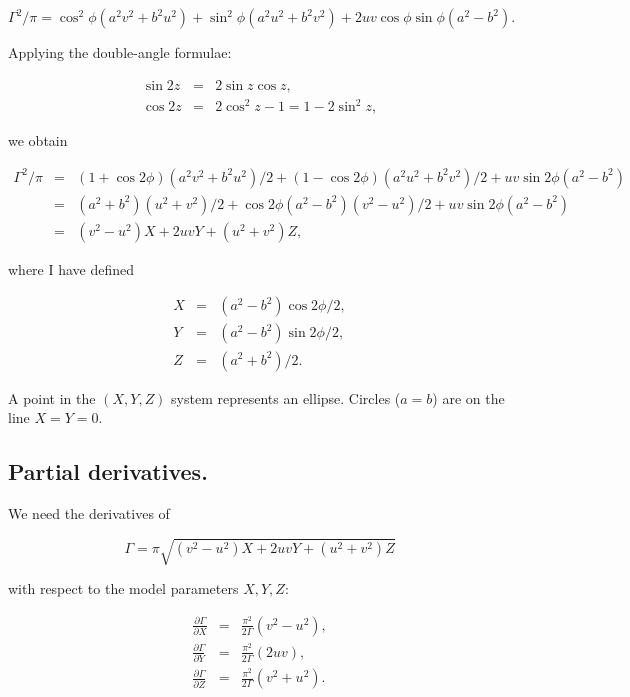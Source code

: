 \documentclass[11pt]{article}
\begin{document}
\begin{equation}
\Gamma^2/\pi = \cos^2\phi(a^2v^2 + b^2u^2) +
               \sin^2\phi(a^2u^2 + b^2v^2) + 2uv\cos\phi\sin\phi(a^2-b^2).
\end{equation}

Applying the double-angle formulae:

\begin{eqnarray}
\sin2z & = & 2\sin z \cos z, \\ 
\cos2z & = & 2\cos^2 z -1 = 1 - 2\sin^2 z, 
\end{eqnarray}

we obtain

\begin{eqnarray} 
\Gamma^2/\pi &=& (1 + \cos 2\phi)(a^2v^2 + b^2u^2)/2 + (1 - \cos 2\phi)(a^2u^2 + b^2v^2)/2 + uv \sin 2\phi (a^2 - b^2) \\
%
             &=& (a^2+b^2)(u^2+v^2)/2 + \cos 2\phi(a^2-b^2)(v^2 -u^2)/2 + uv\sin 2\phi (a^2 - b^2) \\
%
             &=& (v^2 -u^2) X + 2uv Y + (u^2+v^2) Z,
\end{eqnarray}

where I have defined 

\begin{eqnarray}
 X &=& (a^2 -b^2)\cos 2\phi /2,\\
 Y &=& (a^2 -b^2)\sin 2\phi /2,\\
 Z &=& (a^2+b^2)/2.
\end{eqnarray}

A point in the $(X,Y,Z)$ system represents an ellipse. Circles ($a=b$)
are on the line $X=Y=0$.

\subsection{Partial derivatives.}

We need the derivatives of

\begin{equation}
\Gamma = \pi \sqrt{(v^2 -u^2) X + 2uv Y + (u^2+v^2) Z}
\end{equation}

with respect to the model parameters $X,Y,Z$:

\begin{eqnarray}
\frac{\partial\Gamma}{\partial X} &=& \frac{\pi^2}{2\Gamma} (v^2 - u^2),\\
\frac{\partial\Gamma}{\partial Y} &=& \frac{\pi^2}{2\Gamma} (2uv),\\
\frac{\partial\Gamma}{\partial Z} &=& \frac{\pi^2}{2\Gamma} (v^2 + u^2).
\end{eqnarray}
\end{document}
